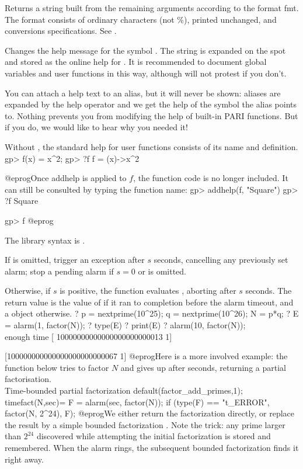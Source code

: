 \label{se:Strprintf}
Returns a string built from the remaining arguments according to the
format fmt. The format consists of ordinary characters (not \%), printed
unchanged, and conversions specifications. See .

\label{se:addhelp}
Changes the help message for the symbol . The string 
is expanded on the spot and stored as the online help for . It is
recommended to document global variables and user functions in this way,
although  will not protest if you don't.

You can attach a help text to an alias, but it will never be
shown: aliases are expanded by the  help operator and we get the help
of the symbol the alias points to. Nothing prevents you from modifying the
help of built-in PARI functions. But if you do, we would like to hear why you
needed it!

Without , the standard help for user functions consists of its
name and definition.
\bprog
gp> f(x) = x^2;
gp> ?f
f =
  (x)->x^2

@eprog\noindent Once addhelp is applied to $f$, the function code is no
longer included. It can still be consulted by typing the function name:
\bprog
gp> addhelp(f, "Square")
gp> ?f
Square

gp> f
@eprog

The library syntax is .

\label{se:alarm}
If  is omitted, trigger an  exception after $s$
seconds, cancelling any previously set alarm; stop a pending alarm if $s =
0$ or is omitted.

Otherwise, if $s$ is positive, the function evaluates ,
aborting after $s$ seconds. The return value is the value of  if
it ran to completion before the alarm timeout, and a  object
otherwise.
\bprog
  ? p = nextprime(10^25); q = nextprime(10^26); N = p*q;
  ? E = alarm(1, factor(N));
  ? type(E)
  ? print(E)
  ? alarm(10, factor(N));   \\ enough time
  [ 10000000000000000000000013 1]

  [100000000000000000000000067 1]
@eprog\noindent Here is a more involved example: the function
 below tries to factor $N$ and gives up after 
seconds, returning a partial factorisation.
\bprog
\\ Time-bounded partial factorization
default(factor_add_primes,1);
timefact(N,sec)=
{
  F = alarm(sec, factor(N));
  if (type(F) == "t_ERROR", factor(N, 2^24), F);
}
@eprog\noindent We either return the factorization directly, or replace the
 result by a simple bounded factorization .
Note the  trick: any prime larger than $2^{24}$
discovered while attempting the initial factorization is stored and
remembered. When the alarm rings, the subsequent bounded factorization finds
it right away.

